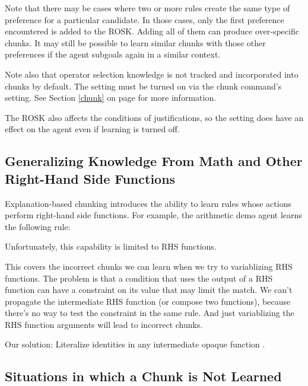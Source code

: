 \begin{itemize}
Note that there may be cases where two or more rules create the same type of preference for a particular candidate. In those cases, only the first preference encountered is added to the ROSK. Adding all of them can produce over-specific chunks. It may still be possible to learn similar chunks with those other preferences if the agent subgoals again in a similar context.

Note also that operator selection knowledge is not tracked and incorporated into chunks by default. The setting must be turned on via the chunk command's  setting. See Section \ref{chunk} on page \pageref{chunk} for more information. 

The ROSK also affects the conditions of justifications, so the  setting does have an effect on the agent even if learning is turned off.


\subsection{Generalizing Knowledge From Math and Other Right-Hand Side Functions}

Explanation-based chunking introduces the ability to learn rules whose actions perform right-hand side functions.  For example, the arithmetic demo agent learns the following rule:


Unfortunately, this capability is limited to RHS functions.

This covers the incorrect chunks we can learn when we try to variablizing RHS functions.  The problem is that a condition that uses the output of a RHS function can have a constraint on its value that may limit the match.  We can't propagate the intermediate RHS function (or compose two functions), because there's no way to test the constraint in the same rule.  And just variablizing the RHS function arguments will lead to incorrect chunks.

Our solution:  Literalize identities in any intermediate opaque function .


\subsection{Situations in which a Chunk is Not Learned}


\end{itemize}
